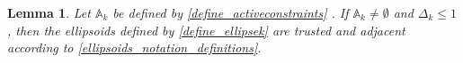 \documentclass{article}
\newtheorem{lemma}[theorem]{Lemma}
\theoremstyle{case}
\numberwithin{theorem}{subsection}
\newcommand{\activeconstraintsk}{{\mathbb A_{k}}}
\newcommand{\bs}{{\beta^{(\star, k)}}}
\newcommand{\bsk}{{\beta_0^{(\star, k)}}}
\newcommand{\dacc}{{\Delta_{\textrm{acc}}}}
\newcommand{\dk}{\Delta_k}
\newcommand{\omegainc}{\omega_{\text{inc}}}
\newcommand{\rotk}{{R^{(k)}}}
\begin{document}
\begin{lemma}
\label{ellsoid_is_suitable_theorem_p2}
Let $\activeconstraintsk$ 
be defined by 
\cref{define_activeconstraints}
.
If $\activeconstraintsk \ne \emptyset$ and $\dk \le 1$, 
then the ellipsoids defined by \cref{define_ellipsek} are trusted and adjacent according to \cref{ellipsoids_notation_definitions}.

\end{lemma}
\end{document}
